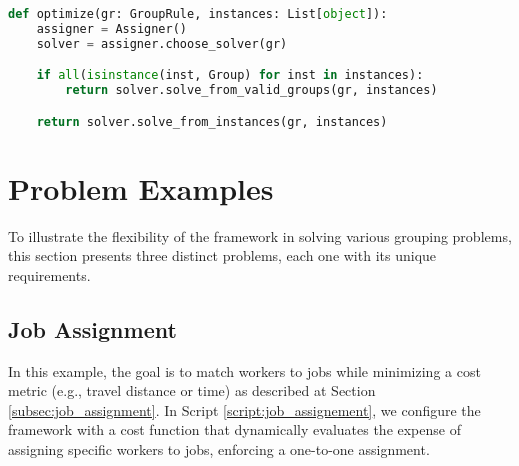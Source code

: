     \begin{lstlisting}[language=Python, caption={Optimizer.}, label={script:optimizer}]
def optimize(gr: GroupRule, instances: List[object]):
    assigner = Assigner()
    solver = assigner.choose_solver(gr)

    if all(isinstance(inst, Group) for inst in instances):
        return solver.solve_from_valid_groups(gr, instances)

    return solver.solve_from_instances(gr, instances)
\end{lstlisting}

    \section{Problem Examples} \label{sec:examples}
To illustrate the flexibility of the framework in solving various grouping problems, this section presents three distinct problems, each one with its unique requirements.

\subsection{Job Assignment}
In this example, the goal is to match workers to jobs while minimizing a cost metric (e.g., travel distance or time) as described at Section \ref{subsec:job_assignment}. In Script \ref{script:job_assignement}, we configure the framework with a cost function that dynamically evaluates the expense of assigning specific workers to jobs, enforcing a one-to-one assignment.

